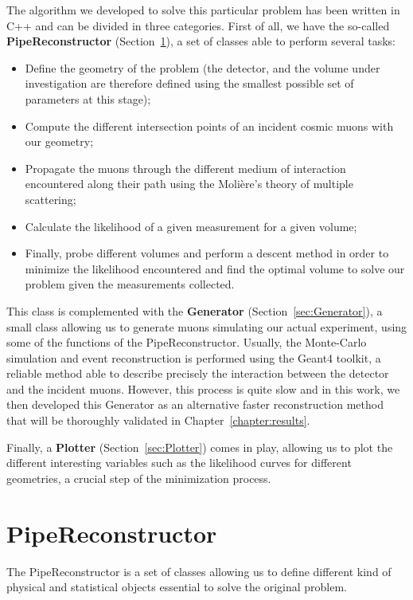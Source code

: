 \documentclass[a4paper, 11pt]{report}
\begin{document}
The algorithm we developed to solve this particular problem has been written in C++ and can be divided in three categories. First of all, we have the so-called \textbf{PipeReconstructor} (Section~\ref{sec:PipeReconstructor}), a set of classes able to perform several tasks:
\begin{itemize}
\item Define the geometry of the problem (the detector, and the volume under investigation are therefore defined using the smallest possible set of parameters at this stage);
\item Compute the different intersection points of an incident cosmic muons with our geometry;
\item Propagate the muons through the different medium of interaction encountered along their path using the Moli\`ere's theory of multiple scattering;
\item Calculate the likelihood of a given measurement for a given volume;
\item Finally, probe different volumes and perform a descent method in order to minimize the likelihood encountered and find the optimal volume to solve our problem given the measurements collected. 
\end{itemize}

This class is complemented with the \textbf{Generator} (Section~\ref{sec:Generator}), a small class allowing us to generate muons simulating our actual experiment, using some of the functions of the PipeReconstructor. Usually, the Monte-Carlo simulation and event reconstruction is performed using the Geant4 toolkit, a reliable method able to describe precisely the interaction between the detector and the incident muons. However, this process is quite slow and in this work, we then developed this Generator as an alternative faster reconstruction method that will be thoroughly validated in Chapter~\ref{chapter:results}.

Finally, a \textbf{Plotter} (Section~\ref{sec:Plotter}) comes in play, allowing us to plot the different interesting variables such as the likelihood curves for different geometries, a crucial step of the minimization process.

\section{PipeReconstructor} \label{sec:PipeReconstructor}

The PipeReconstructor is a set of classes allowing us to define different kind of physical and statistical objects essential to solve the original problem.
\end{document}
